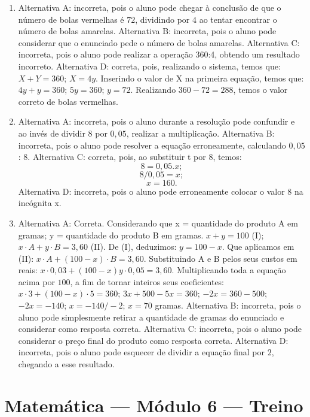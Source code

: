 \begin{enumerate}
\item Alternativa A: incorreta, pois o aluno pode chegar à conclusão de que o
número de bolas vermelhas é $72$, dividindo por $4$ ao tentar encontrar o
número de bolas amarelas.
Alternativa B: incorreta, pois o aluno pode considerar que o enunciado
pede o número de bolas amarelas.
Alternativa C: incorreta, pois o aluno pode realizar a operação $360$:4,
obtendo um resultado incorreto.
Alternativa D: correta, pois, realizando o sistema, temos que: $X + Y = 360$; $X = 4y$. Inserindo o valor de X na primeira equação, temos que: $4y + y = 360$; $5y = 360$; $y = 72$. Realizando $360 - 72 = 288$, temos o valor correto de bolas vermelhas.

\item Alternativa A: incorreta, pois o aluno durante a resolução pode
confundir e ao invés de dividir $8$ por $0,05$, realizar a multiplicação.
Alternativa B: incorreta, pois o aluno pode resolver a equação
erroneamente, calculando $0,05$ : $8$.
Alternativa C: correta, pois, ao substituir t por $8$, temos: 
$$8 = 0,05 . x;$$ 
$$8/0,05 = x;$$ 
$$x = 160.$$
Alternativa D: incorreta, pois o aluno pode erroneamente colocar o valor
8 na incógnita x.

\item Alternativa A: Correta. Considerando que x = quantidade do produto A em gramas; y = quantidade do produto B em gramas. $x + y = 100$ (I); $x·A + y·B = 3,60$ (II). De (I), deduzimos: $y = 100 - x$. Que aplicamos em (II): $x·A + (100-x)·B = 3,60$. Substituindo A e B pelos seus custos em reais: $x·0,03 + (100-x)y·0,05 = 3,60$. Multiplicando toda a equação acima por $100$, a fim de tornar inteiros
seus coeficientes: $x·3 + (100-x)·5 = 360$; $3x + 500 - 5x = 360$; $-2x = 360 - 500$; $-2x = -140$; $x = -140/-2$; $x = 70$ gramas. 
Alternativa B: incorreta, pois o aluno pode simplesmente retirar a
quantidade de gramas do enunciado e considerar como resposta correta.
Alternativa C: incorreta, pois o aluno pode considerar o preço final do
produto como resposta correta.
Alternativa D: incorreta, pois o aluno pode esquecer de dividir a
equação final por $2$, chegando a esse resultado.
\end{enumerate}

\section*{Matemática — Módulo 6 — Treino}

